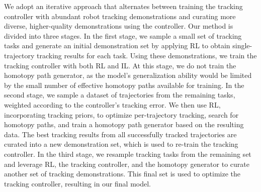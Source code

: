 We adopt an iterative approach that alternates between training the tracking controller with abundant robot tracking demonstrations and curating more diverse, higher-quality demonstrations using the controller. Our method is divided into three stages.
In the first stage, we sample a small set of tracking tasks and generate an initial demonstration set by applying RL to obtain single-trajectory tracking results for each task. Using these demonstrations, we train the tracking controller with both RL and IL. At this stage, we do not train the homotopy path generator, as the model's generalization ability would be limited by the small number of effective homotopy paths available for training.
In the second stage, we sample a dataset of trajectories from the remaining tasks, weighted according to the controller's tracking error. We then use RL, incorporating tracking priors, to optimize per-trajectory tracking, search for homotopy paths, and train a homotopy path generator based on the resulting data. The best tracking results from all successfully tracked trajectories are curated into a new demonstration set, which is used to re-train the tracking controller.
In the third stage, we resample tracking tasks from the remaining set and leverage RL, the tracking controller, and the homotopy generator to curate another set of tracking demonstrations. This final set is used to optimize the tracking controller, resulting in our final model.

